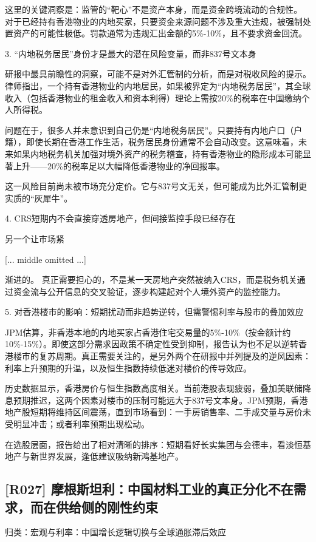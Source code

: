 \documentclass[11pt]{ctexart}
\begin{document}
这里的关键洞察是：监管的“靶心”不是资产本身，而是资金跨境流动的合规性。 对于已经持有香港物业的内地买家，只要资金来源问题不涉及重大违规，被强制处置资产的可能性极低。罚款通常为违规汇出金额的5\%-10\%，且不要求资金回流。

3. “内地税务居民”身份才是最大的潜在风险变量，而非837号文本身

研报中最具前瞻性的洞察，可能不是对外汇管制的分析，而是对税收风险的提示。律师指出，一个持有香港物业的内地居民，如果被界定为“内地税务居民”，其全球收入（包括香港物业的租金收入和资本利得）理论上需按20\%的税率在中国缴纳个人所得税。

问题在于，很多人并未意识到自己仍是“内地税务居民”。只要持有内地户口（户籍），即使长期在香港工作生活，税务居民身份通常不会自动改变。这意味着，未来如果内地税务机关加强对境外资产的税务稽查，持有香港物业的隐形成本可能显著上升——20\%的税率足以大幅降低香港物业的净回报率。

这一风险目前尚未被市场充分定价。它与837号文无关，但可能成为比外汇管制更实质的“灰犀牛”。

4. CRS短期内不会直接穿透房地产，但间接监控手段已经存在

另一个让市场紧

[... middle omitted ...]

渐进的。 真正需要担心的，不是某一天房地产突然被纳入CRS，而是税务机关通过资金流与公开信息的交叉验证，逐步构建起对个人境外资产的监控能力。

5. 对香港楼市的影响：短期扰动而非趋势逆转，但需警惕利率与股市的叠加效应

JPM估算，非香港本地的内地买家占香港住宅交易量的5\%-10\%（按金额计约10\%-15\%）。即使这部分需求因政策不确定性受到抑制，报告认为也不足以逆转香港楼市的复苏周期。真正需要关注的，是另外两个在研报中并列提及的逆风因素：利率上升预期的升温，以及恒生指数持续低迷对楼价的传导效应。

历史数据显示，香港房价与恒生指数高度相关。当前港股表现疲弱，叠加美联储降息预期推迟，这两个因素对楼市的压制可能远大于837号文本身。JPM预期，香港地产股短期将维持区间震荡，直到市场看到：一手房销售率、二手成交量与房价未受明显冲击；或者利率预期出现松动。

在选股层面，报告给出了相对清晰的排序：短期看好长实集团与会德丰，看淡恒基地产与新世界发展，逢低建议吸纳新鸿基地产。

\subsection{[R027] 摩根斯坦利：中国材料工业的真正分化不在需求，而在供给侧的刚性约束}
{\small\color{refgray}归类：宏观与利率：中国增长逻辑切换与全球通胀滞后效应}
\end{document}
